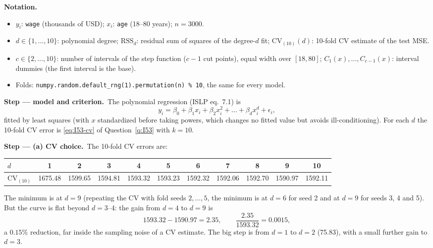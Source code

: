 \documentclass[11pt,a4paper]{article}
\numberwithin{equation}{questao}   %
\newenvironment{notacao}{\par\smallskip\noindent\textbf{Notation.}\begin{itemize}[leftmargin=1.4em,topsep=1pt,itemsep=0pt]\small}{\end{itemize}}
\newcommand{\passo}[2]{\par\smallskip\noindent\textbf{Step --- #1.}~#2}
\begin{document}
\begin{sol}
\begin{notacao}
\item $y_i$: \texttt{wage} (thousands of USD); $x_i$: \texttt{age} (18--80 years); $n=3000$.
\item $d\in\{1,\dots,10\}$: polynomial degree; $\mathrm{RSS}_d$: residual sum of squares of the
  degree-$d$ fit; $\mathrm{CV}_{(10)}(d)$: 10-fold CV estimate of the test MSE.
\item $c\in\{2,\dots,10\}$: number of intervals of the step function ($c-1$ cut points), equal
  width over $[18,80]$; $C_1(x),\dots,C_{c-1}(x)$: interval dummies (the first interval is the base).
\item Folds: \texttt{numpy.random.default\_rng(1).permutation(n) \% 10}, the same for every model.
\end{notacao}

\passo{model and criterion}{The polynomial regression (ISLP eq.~7.1) is
\begin{equation}\label{eq:I76-poly}
y_i=\beta_0+\beta_1x_i+\beta_2x_i^2+\dots+\beta_dx_i^d+\epsilon_i ,
\end{equation}
fitted by least squares (with $x$ standardized before taking powers, which changes no fitted
value but avoids ill-conditioning). For each $d$ the 10-fold CV error is \eqref{eq:I53-cv} of
Question~\ref{q:I53} with $k=10$.}

\passo{(a) CV choice}{The 10-fold CV errors are:
\begin{center}\small\setlength{\tabcolsep}{3.5pt}\begin{tabular}{lcccccccccc}\toprule
$d$ & 1 & 2 & 3 & 4 & 5 & 6 & 7 & 8 & 9 & 10\\\midrule
$\mathrm{CV}_{(10)}$ & 1675.48 & 1599.65 & 1594.81 & 1593.32 & 1593.23 & 1592.32 & 1592.06 & 1592.70 & 1590.97 & 1592.11\\\bottomrule\end{tabular}\end{center}
The minimum is at $d=9$ (repeating the CV with fold seeds $2,\dots,5$, the minimum is at $d=6$
for seed 2 and at $d=9$ for seeds 3, 4 and 5). But the curve is flat beyond $d=3$--4:
the gain from $d=4$ to $d=9$ is
\begin{equation}\label{eq:I76-gain}
1593.32-1590.97=2.35,\qquad \frac{2.35}{1593.32}=0.0015,
\end{equation}
a $0.15\%$ reduction, far inside the sampling noise of a CV estimate. The big step is from
$d=1$ to $d=2$ (75.83), with a small further gain to $d=3$.}


\end{sol}
\end{document}
